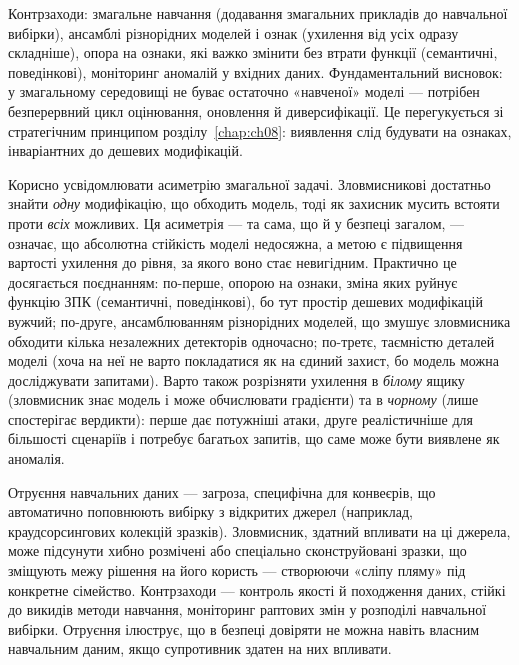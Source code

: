 \begin{tikzfig}
\end{tikzfig}

Контрзаходи: змагальне навчання (додавання змагальних прикладів до навчальної вибірки), ансамблі різнорідних моделей і ознак (ухилення від усіх одразу складніше), опора на ознаки, які важко змінити без втрати функції (семантичні, поведінкові), моніторинг аномалій у вхідних даних. Фундаментальний висновок: у змагальному середовищі не буває остаточно «навченої» моделі --- потрібен безперервний цикл оцінювання, оновлення й диверсифікації. Це перегукується зі стратегічним принципом розділу~\ref{chap:ch08}: виявлення слід будувати на ознаках, інваріантних до дешевих модифікацій.

Корисно усвідомлювати асиметрію змагальної задачі. Зловмисникові достатньо знайти \emph{одну} модифікацію, що обходить модель, тоді як захисник мусить встояти проти \emph{всіх} можливих. Ця асиметрія --- та сама, що й у безпеці загалом, --- означає, що абсолютна стійкість моделі недосяжна, а метою є підвищення вартості ухилення до рівня, за якого воно стає невигідним. Практично це досягається поєднанням: по-перше, опорою на ознаки, зміна яких руйнує функцію ЗПК (семантичні, поведінкові), бо тут простір дешевих модифікацій вужчий; по-друге, ансамблюванням різнорідних моделей, що змушує зловмисника обходити кілька незалежних детекторів одночасно; по-третє, таємністю деталей моделі (хоча на неї не варто покладатися як на єдиний захист, бо модель можна досліджувати запитами). Варто також розрізняти ухилення в \emph{білому} ящику (зловмисник знає модель і може обчислювати градієнти) та в \emph{чорному} (лише спостерігає вердикти): перше дає потужніші атаки, друге реалістичніше для більшості сценаріїв і потребує багатьох запитів, що саме може бути виявлене як аномалія.

Отруєння навчальних даних --- загроза, специфічна для конвеєрів, що автоматично поповнюють вибірку з відкритих джерел (наприклад, краудсорсингових колекцій зразків). Зловмисник, здатний впливати на ці джерела, може підсунути хибно розмічені або спеціально сконструйовані зразки, що зміщують межу рішення на його користь --- створюючи «сліпу пляму» під конкретне сімейство. Контрзаходи --- контроль якості й походження даних, стійкі до викидів методи навчання, моніторинг раптових змін у розподілі навчальної вибірки. Отруєння ілюструє, що в безпеці довіряти не можна навіть власним навчальним даним, якщо супротивник здатен на них впливати.

